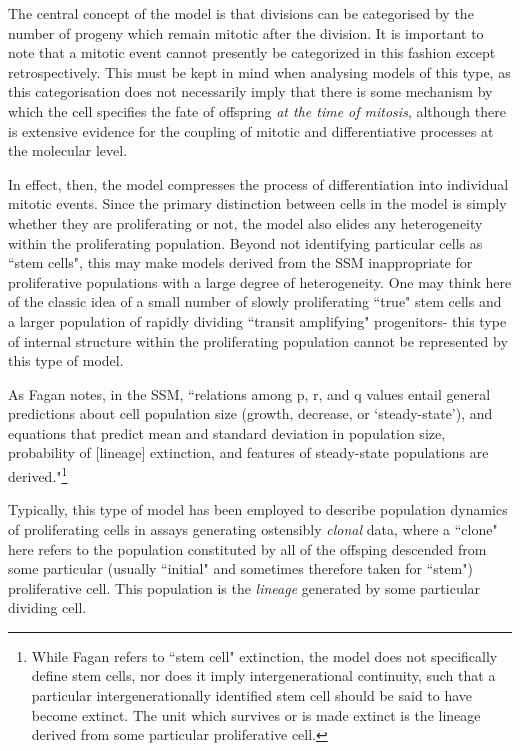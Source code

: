 The central concept of the model is that divisions can be categorised by the number of progeny which remain mitotic after the division. It is important to note that a mitotic event cannot presently be categorized in this fashion except retrospectively. This must be kept in mind when analysing models of this type, as this categorisation does not necessarily imply that there is some mechanism by which the cell specifies the fate of offspring \textit{at the time of mitosis}, although there is extensive evidence for the coupling of mitotic and differentiative processes at the molecular level.

In effect, then, the model compresses the process of differentiation into individual mitotic events. Since the primary distinction between cells in the model is simply whether they are proliferating or not, the model also elides any heterogeneity within the proliferating population. Beyond not identifying particular cells as ``stem cells", this may make models derived from the SSM inappropriate for proliferative populations with a large degree of heterogeneity. One may think here of the classic idea of a small number of slowly proliferating ``true" stem cells and a larger population of rapidly dividing ``transit amplifying" progenitors- this type of internal structure within the proliferating population cannot be represented by this type of model.

As Fagan notes, in the SSM, ``relations among p, r, and q values entail general predictions about cell population size (growth, decrease, or ‘steady-state’), and equations that predict mean and standard deviation in population size, probability of [lineage] extinction, and features of steady-state populations are derived."\footnote{While Fagan refers to ``stem cell" extinction, the model does not specifically define stem cells, nor does it imply intergenerational continuity, such that a particular intergenerationally identified stem cell should be said to have become extinct. The unit which survives or is made extinct is the lineage derived from some particular proliferative cell.}\cite[p.60]{Fagan2013}

Typically, this type of model has been employed to describe population dynamics of proliferating cells in assays generating ostensibly \textit{clonal} data, where a ``clone" here refers to the population constituted by all of the offsping descended from some particular (usually ``initial" and sometimes therefore taken for ``stem") proliferative cell. This population is the \textit{lineage} generated by some particular dividing cell.





